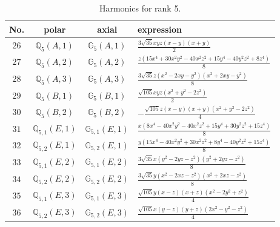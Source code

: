 \documentclass[fleqn,8pt,landscape]{jsarticle}
\begin{document}
\begin{table}[ht!]
\begin{center}
\caption{Harmonics for rank 5.}
\renewcommand{\arraystretch}{1.3}
\begin{tabular}{cccl} \hline \hline
No. & polar & axial & expression \\ \hline
$ 26 $ & $ \mathbb{Q}_{5}(A,1) $ & $ \mathbb{G}_{5}(A,1) $ & $ \frac{3 \sqrt{35} x y z \left(x - y\right) \left(x + y\right)}{2} $ \\
$ 27 $ & $ \mathbb{Q}_{5}(A,2) $ & $ \mathbb{G}_{5}(A,2) $ & $ \frac{z \left(15 x^{4} + 30 x^{2} y^{2} - 40 x^{2} z^{2} + 15 y^{4} - 40 y^{2} z^{2} + 8 z^{4}\right)}{8} $ \\
$ 28 $ & $ \mathbb{Q}_{5}(A,3) $ & $ \mathbb{G}_{5}(A,3) $ & $ \frac{3 \sqrt{35} z \left(x^{2} - 2 x y - y^{2}\right) \left(x^{2} + 2 x y - y^{2}\right)}{8} $ \\
$ 29 $ & $ \mathbb{Q}_{5}(B,1) $ & $ \mathbb{G}_{5}(B,1) $ & $ \frac{\sqrt{105} x y z \left(x^{2} + y^{2} - 2 z^{2}\right)}{2} $ \\
$ 30 $ & $ \mathbb{Q}_{5}(B,2) $ & $ \mathbb{G}_{5}(B,2) $ & $ - \frac{\sqrt{105} z \left(x - y\right) \left(x + y\right) \left(x^{2} + y^{2} - 2 z^{2}\right)}{4} $ \\
$ 31 $ & $ \mathbb{Q}_{5,1}(E,1) $ & $ \mathbb{G}_{5,1}(E,1) $ & $ \frac{x \left(8 x^{4} - 40 x^{2} y^{2} - 40 x^{2} z^{2} + 15 y^{4} + 30 y^{2} z^{2} + 15 z^{4}\right)}{8} $ \\
$ 32 $ & $ \mathbb{Q}_{5,2}(E,1) $ & $ \mathbb{G}_{5,2}(E,1) $ & $ \frac{y \left(15 x^{4} - 40 x^{2} y^{2} + 30 x^{2} z^{2} + 8 y^{4} - 40 y^{2} z^{2} + 15 z^{4}\right)}{8} $ \\
$ 33 $ & $ \mathbb{Q}_{5,1}(E,2) $ & $ \mathbb{G}_{5,1}(E,2) $ & $ \frac{3 \sqrt{35} x \left(y^{2} - 2 y z - z^{2}\right) \left(y^{2} + 2 y z - z^{2}\right)}{8} $ \\
$ 34 $ & $ \mathbb{Q}_{5,2}(E,2) $ & $ \mathbb{G}_{5,2}(E,2) $ & $ \frac{3 \sqrt{35} y \left(x^{2} - 2 x z - z^{2}\right) \left(x^{2} + 2 x z - z^{2}\right)}{8} $ \\
$ 35 $ & $ \mathbb{Q}_{5,1}(E,3) $ & $ \mathbb{G}_{5,1}(E,3) $ & $ \frac{\sqrt{105} y \left(x - z\right) \left(x + z\right) \left(x^{2} - 2 y^{2} + z^{2}\right)}{4} $ \\
$ 36 $ & $ \mathbb{Q}_{5,2}(E,3) $ & $ \mathbb{G}_{5,2}(E,3) $ & $ \frac{\sqrt{105} x \left(y - z\right) \left(y + z\right) \left(2 x^{2} - y^{2} - z^{2}\right)}{4} $ \\
 \hline \hline
\end{tabular}
\end{center}
\end{table}
\end{document}
